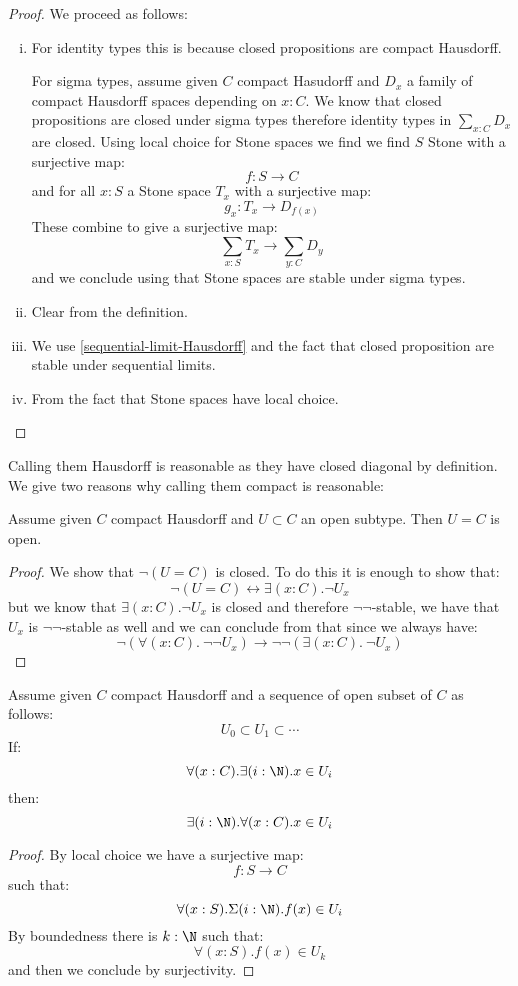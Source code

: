 \begin{proof}
We proceed as follows:
\begin{enumerate}[(i)]
\item For identity types this is because closed propositions are compact Hausdorff.

For sigma types, assume given $C$ compact Hasudorff and $D_x$ a family of compact Hausdorff spaces depending on $x:C$. We know that closed propositions are closed under sigma types therefore identity types in $\sum_{x:C}D_x$ are closed. Using local choice for Stone spaces we find we find $S$ Stone with a surjective map:
\[f:S\to C\]
and for all $x:S$ a Stone space $T_x$ with a surjective map:
\[g_x:T_x\to D_{f(x)}\]
These combine to give a surjective map:
\[\sum_{x:S}T_x \to \sum_{y:C}D_y\]
and we conclude using that Stone spaces are stable under sigma types.

\item Clear from the definition.

\item We use \cref{sequential-limit-Hausdorff} and the fact that closed proposition are stable under sequential limits.

\item From the fact that Stone spaces have local choice.
\end{enumerate}
\end{proof}

Calling them Hausdorff is reasonable as they have closed diagonal by definition. We give two reasons why calling them compact is reasonable:

\begin{lemma}\label{compact-hausdorff-compact}
Assume given $C$ compact Hausdorff and $U\subset C$ an open subtype. Then $U=C$ is open.
\end{lemma}

\begin{proof}
We show that $\neg(U=C)$ is closed. To do this it is enough to show that:
\[\neg(U=C) \leftrightarrow \exists (x:C).\neg U_x\]
but we know that $\exists (x:C).\neg U_x$ is closed and therefore $\neg\neg$-stable, we have that $U_x$ is $\neg\neg$-stable as well and we can conclude from that since we always have:
\[\neg(\forall(x:C).\ \neg\neg U_x) \to \neg\neg(\exists(x:C).\ \neg U_x)\]
\end{proof}

\begin{lemma}\label{compact-hausforff-countable-cover}
Assume given $C$ compact Hausdorff and a sequence of open subset of $C$ as follows:
\[U_0\subset U_1 \subset \cdots\]
If:
\[\forall(x:C).\exists(i:\N). x\in U_i\]
then:
\[\exists(i:\N). \forall(x:C).x\in U_i\]
\end{lemma}

\begin{proof}
By local choice we have a surjective map:
\[ f: S \to C\]
such that:
\[\forall(x:S).\Sigma (i:\N). f(x)\in U_i\]
By boundedness there is $k:\N$ such that:
\[\forall(x:S). f(x)\in U_k\]
and then we conclude by surjectivity.
\end{proof}

